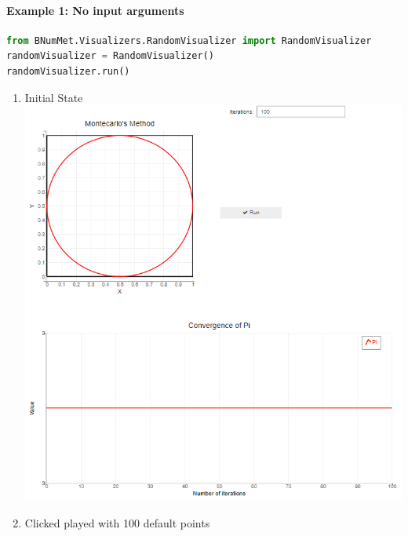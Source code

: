 \paragraph{Example 1: No input arguments}
\begin{lstlisting}[language=Python]
from BNumMet.Visualizers.RandomVisualizer import RandomVisualizer
randomVisualizer = RandomVisualizer()
randomVisualizer.run()
\end{lstlisting}

\begin{enumerate}
    \item Initial State\\
    \includegraphics[scale=0.7]{Include/Images/Thesis/Documentation/Visualizers/Randomness/Example 1/Example 1 - 00 - Initial State.png}
    \item Clicked played with 100 default points\\

\end{enumerate}
